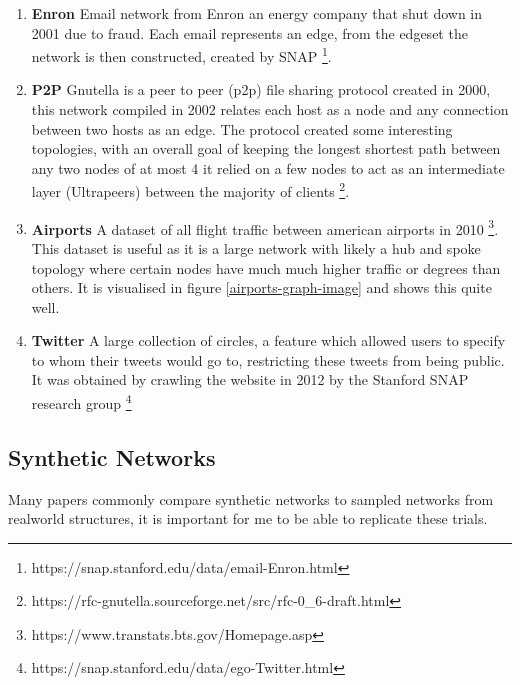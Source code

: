 \documentclass{article}
\begin{document}
\begin{enumerate}
	\item \textbf{Enron} Email network from Enron an energy company that shut down in 2001 due to fraud.
	      Each email represents an edge, from the edgeset the network is then constructed, created by SNAP \footnote{https://snap.stanford.edu/data/email-Enron.html}.
	\item \textbf{P2P} Gnutella is a peer to peer (p2p) file sharing protocol created in 2000,
	      this network compiled in 2002 relates each host as a node and any connection between two hosts as an edge.
	      The protocol created some interesting topologies, with an overall goal of keeping the longest shortest path between any two nodes of at most 4 it relied on a few nodes to act as an intermediate layer (Ultrapeers) between the majority of clients \footnote{https://rfc-gnutella.sourceforge.net/src/rfc-0\_6-draft.html}.
	\item \textbf{Airports} A dataset of all flight traffic between american airports in 2010 \footnote{https://www.transtats.bts.gov/Homepage.asp}.
	      This dataset is useful as it is a large network with likely a hub and spoke topology where certain nodes have much much higher traffic or degrees than others. It is visualised in figure \ref{airports-graph-image} and shows this quite well.
	\item \textbf{Twitter} A large collection of circles, a feature which allowed users to specify to whom their tweets would go to, restricting these tweets from being public.
	      It was obtained by crawling the website in 2012 by the Stanford SNAP research group \footnote{https://snap.stanford.edu/data/ego-Twitter.html}
\end{enumerate}

\subsection{Synthetic Networks}
Many papers commonly compare synthetic networks to sampled networks from realworld structures, it is important for me to be able to replicate these trials.
\end{document}
